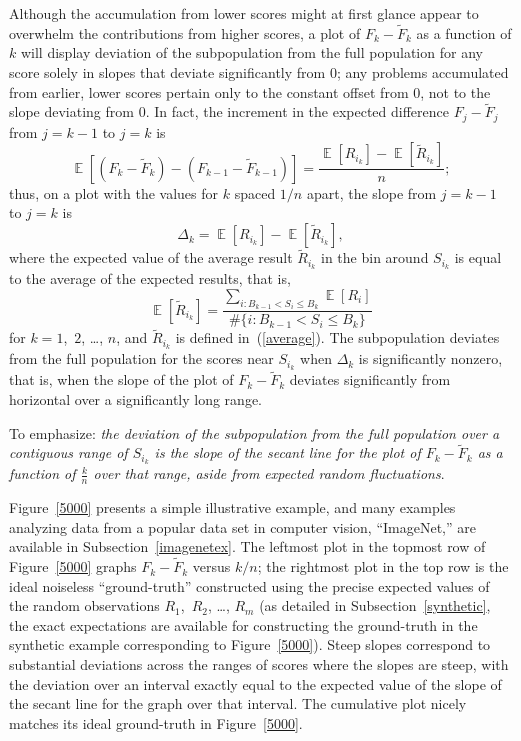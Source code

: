 \documentclass{article}
\DeclareMathOperator{\E}{\mathop{}\mathbb{E}}
\begin{document}
Although the accumulation from lower scores might at first glance appear
to overwhelm the contributions from higher scores,
a plot of $F_k-\tilde{F}_k$ as a function of $k$ will display deviation
of the subpopulation from the full population
for any score solely in slopes that deviate significantly from 0;
any problems accumulated from earlier, lower scores pertain
only to the constant offset from 0, not to the slope deviating from 0.
In fact, the increment in the expected difference $F_j-\tilde{F}_j$
from $j = k-1$ to $j = k$ is
%
\begin{equation}
\E[ (F_k-\tilde{F}_k) - (F_{k-1}-\tilde{F}_{k-1}) ]
= \frac{\E[ R_{i_k} ] - \E[ \tilde{R}_{i_k} ]}{n};
\end{equation}
%
thus, on a plot with the values for $k$ spaced $1/n$ apart,
the slope from $j = k-1$ to $j = k$ is
%
\begin{equation}
\Delta_k = \E[ R_{i_k} ] - \E[ \tilde{R}_{i_k} ],
\end{equation}
%
where the expected value of the average result $\tilde{R}_{i_k}$
in the bin around $S_{i_k}$ is equal to the average of the expected results,
that is,
%
\begin{equation}
\label{linearity}
\E[ \tilde{R}_{i_k} ] = \frac{\sum_{i : B_{k-1} < S_i \le B_k} \E[ R_i ]}
                             {\#\{i : B_{k-1} < S_i \le B_k\}}
\end{equation}
%
for $k = 1$,~$2$, \dots, $n$,
and $\tilde{R}_{i_k}$ is defined in~(\ref{average}).
The subpopulation deviates from the full population for the scores near
$S_{i_k}$ when $\Delta_k$ is significantly nonzero, that is, when the slope
of the plot of $F_k-\tilde{F}_k$ deviates significantly from horizontal
over a significantly long range.

To emphasize: {\it the deviation of the subpopulation from the full population
over a contiguous range of $S_{i_k}$
is the slope of the secant line for the plot of $F_k-\tilde{F}_k$
as a function of $\frac{k}{n}$ over that range,
aside from expected random fluctuations}.

Figure~\ref{5000} presents a simple illustrative example,
and many examples analyzing data from a popular data set in computer vision,
``ImageNet,'' are available in Subsection~\ref{imagenetex}.
The leftmost plot in the topmost row of Figure~\ref{5000}
graphs $F_k-\tilde{F}_k$ versus $k/n$; the rightmost plot in the top row
is the ideal noiseless ``ground-truth'' constructed using the precise
expected values of the random observations $R_1$,~$R_2$, \dots, $R_m$
(as detailed in Subsection~\ref{synthetic},
the exact expectations are available for constructing the ground-truth
in the synthetic example corresponding to Figure~\ref{5000}).
Steep slopes correspond to substantial deviations across the ranges of scores
where the slopes are steep, with the deviation over an interval exactly equal
to the expected value of the slope of the secant line for the graph
over that interval. The cumulative plot nicely matches its ideal ground-truth
in Figure~\ref{5000}.
\end{document}
